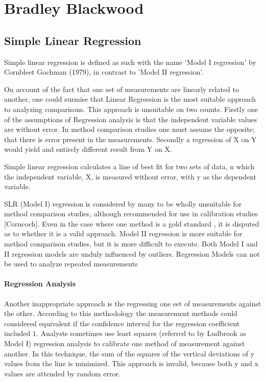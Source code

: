 \documentclass[MAIN.tex]{subfiles}
\begin{document}
	\chapter{Bradley Blackwood}
\section{Simple Linear Regression}


Simple linear regression is defined as such with the name `Model I regression' by Cornbleet Gochman (1979), in contrast to 'Model II regression'.

On account of the fact that one set of measurements are linearly related to another, one could surmise that Linear Regression is the most suitable approach to analyzing comparisons. This approach is unsuitable on two counts. Firstly one of the assumptions of Regression analysis is that the independent variable values are without error. In method comparison studies one must assume the opposite; that there is error present in the measurements. Secondly a regression of X on Y would yield and entirely different result from Y on X.


Simple linear regression calculates a line of best fit for two
sets of data, n which the independent variable, X, is measured without error, with y as the dependent variable.  

SLR (Model I) regression is considered by many \citet{BA83,CornCoch,ludbrook97} to be wholly unsuitable for
method comparison studies, although recommended for use in calibration studies [Corncoch]. Even in the case where one
method is a gold standard , it is disputed as to whether it is a valid approach. Model II regression is more suitable for method comparison studies, but it is more difficult to execute. Both Model I and II regression models are unduly influenced by outliers. Regression Models can not be used to analyze repeated measurements

\subsubsection{Regression Analysis}
Another inappropriate approach is the regressing one set of measurements against the other. According to this methodology the measurement methods could considered equivalent if the confidence interval for
the regression coefficient included $1$. Analysts sometimes use least squares (referred to by Ludbrook as Model I) regression analysis to calibrate one method of measurement against another. In this technique, the sum of the squares of the vertical deviations of y values from the line is minimized. This approach is invalid, because both y and x values are attended by random error.
\end{document}

